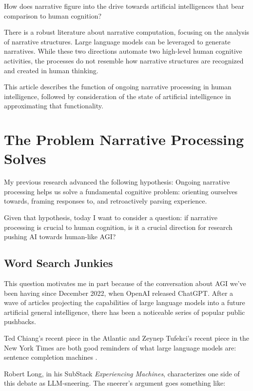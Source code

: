 \documentclass[11pt,a4paper]{article}
\begin{document}
How does narrative figure into the drive towards artificial intelligences that bear comparison to human cognition?

There is a robust literature about narrative computation, focusing on the analysis of narrative structures. Large language models can be leveraged to generate narratives. While these two directions automate two high-level human cognitive activities, the processes do not resemble how narrative structures are recognized and created in human thinking.

This article describes the function of ongoing narrative processing in human intelligence, followed by consideration of the state of artificial intelligence in approximating that functionality.

\section{The Problem Narrative Processing Solves}
\label{sec:problem}

My previous research advanced the following hypothesis: Ongoing narrative processing helps us solve a fundamental cognitive problem: orienting ourselves towards, framing responses to, and retroactively parsing experience.

Given that hypothesis, today I want to consider a question: if narrative processing is crucial to human cognition, is it a crucial direction for research pushing AI towards human-like AGI?

\subsection{Word Search Junkies}
This question motivates me in part because of the conversation about AGI we've been having since December 2022, when OpenAI released ChatGPT. After a wave of articles projecting the capabilities of large language models into a future artificial general intelligence, there has been a noticeable series of popular public pushbacks.

Ted Chiang's recent piece in the Atlantic and Zeynep Tufekci's recent piece in the New York Times are both good reminders of what large language models are: sentence completion machines \citep{chiang_plausibility,tufekci2026hype}.

Robert Long, in his SubStack \textit{Experiencing Machines}, characterizes one side of this debate as LLM-sneering. The sneerer's argument goes something like:
\end{document}
